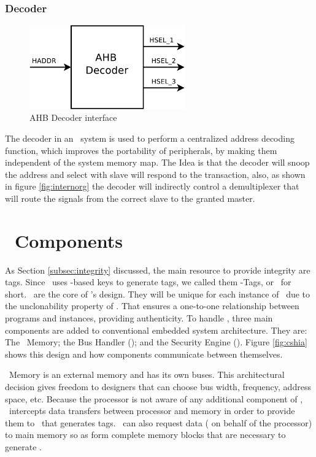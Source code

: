 \subsubsection{Decoder}

\begin{figure}[ht]
    \centering
    \includegraphics[width=0.6\textwidth]{figures/pdf/ahb_decoder_new.pdf}
    \caption{AHB Decoder interface}
    \label{fig:decoder int}
\end{figure}
 The decoder in an \amba~system is used to perform a centralized address decoding function, which improves the portability of peripherals, by making them independent of the system memory map. The Idea is that the decoder will snoop the address and select with slave will respond to the transaction, also, as shown in figure \ref{fig:internorg} the decoder will indirectly control a demultiplexer that will route the signals from the correct slave to the granted master.

 

\section{\cshia~Components}
\label{sec:Components-of-the-Architecture}
As Section \ref{subsec:integrity} discussed, the main resource to provide integrity are tags. Since \cshia~uses \puf-based keys to generate tags, we called them \puf-Tags, or \ptags~for short. \ptags~are the core of \cshia's design. They will be unique for each instance of \cshia~due to the unclonability property of \pufs. That ensures a one-to-one relationship between programs and instances, providing authenticity. To handle \ptags, three main components are added to conventional embedded system architecture. They are: The \ptag~Memory; the Bus Handler (\handler); and the Security Engine (\seceng). Figure \ref{fig:cshia} shows this design and how components communicate between themselves. 

\ptag~Memory is an external memory and has its own buses. This architectural decision gives freedom to designers that can choose bus width, frequency, address space, etc. Because the processor is not aware of any additional component of \cshia, \handler~intercepts data transfers between processor and memory in order to provide them to \seceng~that generates tags. \handler~can also request data ( on behalf of the processor) to main memory so as form complete memory blocks that are necessary to generate \ptags.

